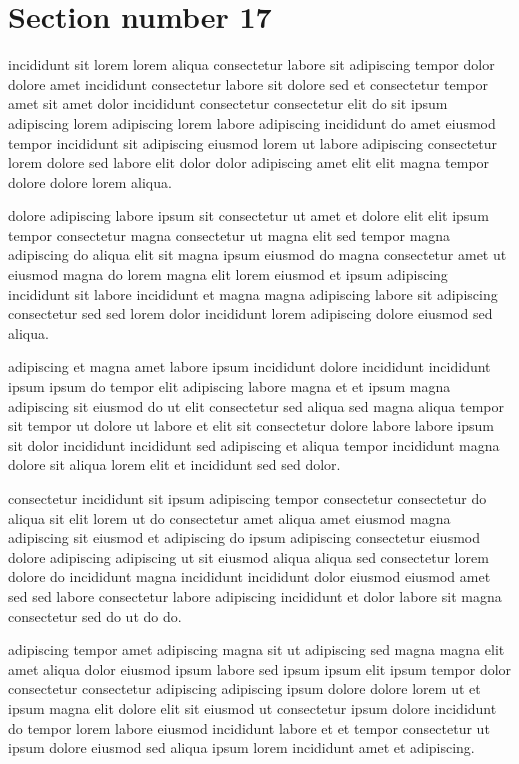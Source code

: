 \documentclass{article}
\begin{document}
\section{Section number 17}\label{sec:17}
incididunt sit lorem lorem aliqua consectetur labore sit adipiscing tempor dolor dolore amet incididunt consectetur labore sit dolore sed et consectetur tempor amet sit amet dolor incididunt consectetur consectetur elit do sit ipsum adipiscing lorem adipiscing lorem labore adipiscing incididunt do amet eiusmod tempor incididunt sit adipiscing eiusmod lorem ut labore adipiscing consectetur lorem dolore sed labore elit dolor dolor adipiscing amet elit elit magna tempor dolore dolore lorem aliqua.

dolore adipiscing labore ipsum sit consectetur ut amet et dolore elit elit ipsum tempor consectetur magna consectetur ut magna elit sed tempor magna adipiscing do aliqua elit sit magna ipsum eiusmod do magna consectetur amet ut eiusmod magna do lorem magna elit lorem eiusmod et ipsum adipiscing incididunt sit labore incididunt et magna magna adipiscing labore sit adipiscing consectetur sed sed lorem dolor incididunt lorem adipiscing dolore eiusmod sed aliqua.

adipiscing et magna amet labore ipsum incididunt dolore incididunt incididunt ipsum ipsum do tempor elit adipiscing labore magna et et ipsum magna adipiscing sit eiusmod do ut elit consectetur sed aliqua sed magna aliqua tempor sit tempor ut dolore ut labore et elit sit consectetur dolore labore labore ipsum sit dolor incididunt incididunt sed adipiscing et aliqua tempor incididunt magna dolore sit aliqua lorem elit et incididunt sed sed dolor.

consectetur incididunt sit ipsum adipiscing tempor consectetur consectetur do aliqua sit elit lorem ut do consectetur amet aliqua amet eiusmod magna adipiscing sit eiusmod et adipiscing do ipsum adipiscing consectetur eiusmod dolore adipiscing adipiscing ut sit eiusmod aliqua aliqua sed consectetur lorem dolore do incididunt magna incididunt incididunt dolor eiusmod eiusmod amet sed sed labore consectetur labore adipiscing incididunt et dolor labore sit magna consectetur sed do ut do do.

adipiscing tempor amet adipiscing magna sit ut adipiscing sed magna magna elit amet aliqua dolor eiusmod ipsum labore sed ipsum ipsum elit ipsum tempor dolor consectetur consectetur adipiscing adipiscing ipsum dolore dolore lorem ut et ipsum magna elit dolore elit sit eiusmod ut consectetur ipsum dolore incididunt do tempor lorem labore eiusmod incididunt labore et et tempor consectetur ut ipsum dolore eiusmod sed aliqua ipsum lorem incididunt amet et adipiscing.
\end{document}
